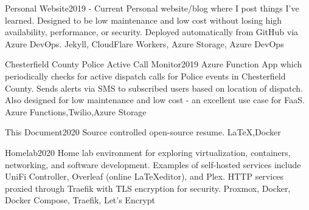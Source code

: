 \begin{projects}
    \project
    {Personal Website}{2019 - Current}
    {}
    {Personal website/blog where I post things I've learned. Designed to be low maintenance and low cost without losing high availability, performance, or security. Deployed automatically from GitHub via Azure DevOps.}
    {Jekyll, CloudFlare Workers, Azure Storage, Azure DevOps}

    \project
    {Chesterfield County Police Active Call Monitor}{2019}
    {}
    {Azure Function App which periodically checks for active dispatch calls for Police events in Chesterfield County. Sends alerts via SMS to subscribed users based on location of dispatch. Also designed for low maintenance and low cost - an excellent use case for FaaS.}
    {Azure Functions,Twilio,Azure Storage}

    \project
    {This Document}{2020}
    {}
    {Source controlled open-source resume.}%
    {\LaTeX,Docker}

    \project
    {Homelab}{2020}
    {}
    {Home lab environment for exploring virtualization, containers, networking, and software development. Examples of self-hosted services include UniFi Controller, Overleaf (online \LaTeX editor), and Plex. HTTP services proxied through Traefik with TLS encryption for security.}
    {Proxmox, Docker, Docker Compose, Traefik, Let's Encrypt}
\end{projects}